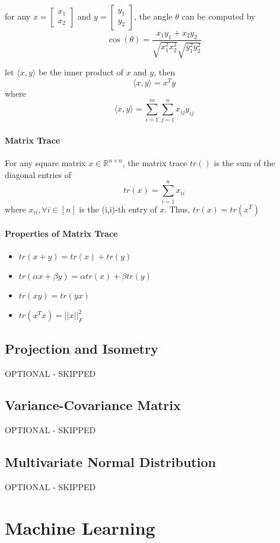 \documentclass{article}
\theoremstyle{definition}
\theoremstyle{remark}
\begin{document}
for any $x = \begin{bmatrix}
    x_1 \\ x_2
\end{bmatrix}$ and $y = \begin{bmatrix}
    y_1 \\ y_2
\end{bmatrix}$, the angle $\theta$ can be computed by $$\cos(\theta) = \frac{x_1y_1 + x_2y_2}{\sqrt{x_1^2x_2^2}\sqrt{y_1^2y_2^2}}$$

let $\langle x,y \rangle$ be the inner product of $x$ and $y$, then $$\langle x,y \rangle = x^Ty$$ where $$\langle x,y \rangle = \sum_{i=1}^m\sum_{j=1}^nx_{ij}y_{ij}$$

\paragraph{Matrix Trace}

For any square matrix $x \in \mathbb{R}^{n\times n}$, the matrix trace $tr()$ is the sum of the diagonal entries of $$tr(x) = \sum_{i=1}^n x_{ii}$$ where $x_{ii}, \forall i \in [n]$ is the (i,i)-th entry of $x$. Thus, $tr(x) = tr(x^T)$

\paragraph{Properties of Matrix Trace}

\begin{itemize}
    \item $tr(x+y) = tr(x) + tr(y)$
    \item $tr(\alpha x + \beta y) = \alpha tr(x) + \beta tr(y)$
    \item $tr(xy) = tr(yx)$
    \item $tr(x^Tx) = ||x||^2_F$
\end{itemize}

\subsection{Projection and Isometry}

OPTIONAL - SKIPPED

\subsection{Variance-Covariance Matrix}

OPTIONAL - SKIPPED

\subsection{Multivariate Normal Distribution}

OPTIONAL - SKIPPED

\section{Machine Learning}
\end{document}

